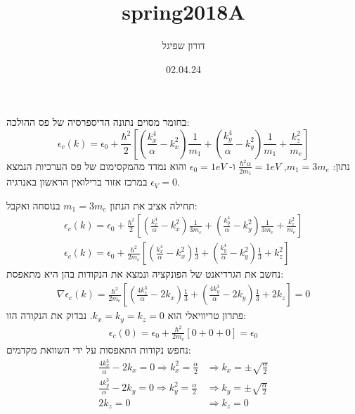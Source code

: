 \documentclass{article}
\title{spring2018A}
\author{דורון שפיגל}
\date{02.04.24}
\begin{document}
\maketitle
\begin{Question}
בחומר מסוים נתונה הדיספרסיה של פס ההולכה:
\begin{equation*}
    \epsilon_{c}(k)= \epsilon_{0}+\frac{\hbar^2}{2}\left[ \left( \frac{k_{x}^4}{\alpha}-k_{x}^2 \right)\frac{1}{m_{1}}+\left( \frac{k_{y}^4}{\alpha}-k_{y}^2 \right)\frac{1}{m_{1}} + \frac{k_{z}^2}{m_{e}} \right]
\end{equation*}
נתון: $m_{1}=3m_{e}$, $\frac{\hbar^2\alpha}{2m_{1}}=1eV$ ו- $\epsilon_{0}=1eV$ והוא נמדד מהמקסימום של פס הערכיות הנמצא במרכז אזור ברילואין הראשון באנרגיה $\epsilon_{V}=0$.
\end{Question}
\begin{Answer}
תחילה אציב את הנתון $m_{1}=3m_{e}$ בנוסחה ואקבל:
\begin{align*}
        \epsilon_{c}(k)= \epsilon_{0}+\frac{\hbar^2}{2}\left[ \left( \frac{k_{x}^4}{\alpha}-k_{x}^2 \right)\frac{1}{3m_{e}}+\left( \frac{k_{y}^4}{\alpha}-k_{y}^2 \right)\frac{1}{3m_{e}} + \frac{k_{z}^2}{m_{e}} \right]\\
        \epsilon_{c}(k)= \epsilon_{0}+\frac{\hbar^2}{2m_{e}}\left[ \left( \frac{k_{x}^4}{\alpha}-k_{x}^2 \right)\frac{1}{3}+\left( \frac{k_{y}^4}{\alpha}-k_{y}^2 \right)\frac{1}{3} + k_{z}^2\right]
\end{align*}
נחשב את הגרדיאנט של הפונקציה ונמצא את הנקודות בהן היא מתאפסת:
\begin{align*}
    \nabla \epsilon_{c}(k)= \frac{\hbar^2}{2m_{e}}\left[ \left( \frac{4k_{x}^3}{\alpha}-2k_{x} \right)\frac{1}{3}+\left( \frac{4k_{y}^3}{\alpha}-2k_{y} \right)\frac{1}{3} + 2k_{z}\right]=0
\end{align*}
פתרון טריוויאלי הוא $k_{x}=k_{y}=k_{z}=0$. נבדוק את הנקודה הזו:
\begin{align*}
    \epsilon_{c}(0)= \epsilon_{0}+\frac{\hbar^2}{2m_{e}}\left[ 0+0+0\right]=\epsilon_{0}
\end{align*}
נחפש נקודות התאפסות על ידי השוואת מקדמים:
\begin{align*}
    \frac{4k_{x}^3}{\alpha}-2k_{x} = 0 \Rightarrow  k_{x}^2=\frac{\alpha}{2} &\Rightarrow k_{x}=\pm\sqrt{\frac{\alpha}{2}}\\
    \frac{4k_{y}^3}{\alpha}-2k_{y} = 0 \Rightarrow  k_{y}^2=\frac{\alpha}{2} &\Rightarrow k_{y}=\pm\sqrt{\frac{\alpha}{2}}\\
    2k_{z} = 0 &\Rightarrow k_{z}=0
\end{align*}

\end{Answer}
\end{document}
